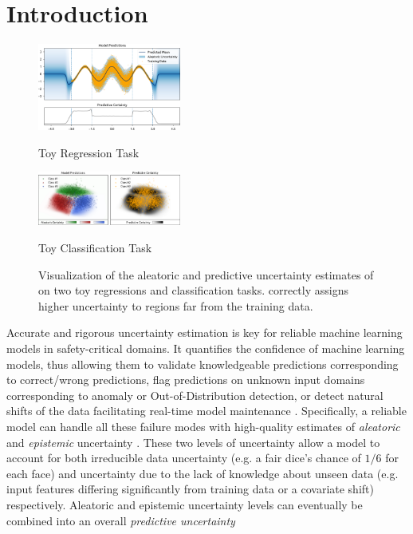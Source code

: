 \section{Introduction}
\label{sec:introduction_007}

\begin{figure}
\vspace{-6mm}
	\centering
	\includegraphics[width=0.42\textwidth]{sections/007_iclr2022/resources/toy-regression-trimmed.png}
    \caption*{Toy Regression Task}
    \vspace{0.3cm}
    \includegraphics[width=0.42\textwidth]{sections/007_iclr2022/resources/toy-classification-trimmed.png}
    \caption*{Toy Classification Task}
    \caption{Visualization of the aleatoric and predictive uncertainty estimates of \NatPNacro{} on two toy regressions and classification tasks. \NatPNacro{} correctly assigns higher uncertainty to regions far from the training data.}
    \label{fig:toy-example-uncertainty}
    \vspace{-6mm}
\end{figure}

Accurate and rigorous uncertainty estimation is key for reliable machine learning models in safety-critical domains. It quantifies the confidence of machine learning models, thus allowing them to validate knowledgeable predictions corresponding to correct/wrong predictions, flag predictions on unknown input domains corresponding to anomaly or Out-of-Distribution detection, or detect natural shifts of the data facilitating real-time model maintenance \citep{dataset-shift, shifts-dataset, comparison-bayesian-diabetic}. Specifically, a reliable model can handle all these failure modes with high-quality estimates of \emph{aleatoric} and \emph{epistemic} uncertainty \citep{uncertainty-deep-learning}. These two levels of uncertainty allow a model to account for both irreducible data uncertainty (e.g. a fair dice's chance of $1/6$ for each face) and uncertainty due to the lack of knowledge about unseen data (e.g. input features differing significantly from training data or a covariate shift) respectively. Aleatoric and epistemic uncertainty levels can eventually be combined into an overall \emph{predictive uncertainty} \citep{uncertainty-deep-learning}

